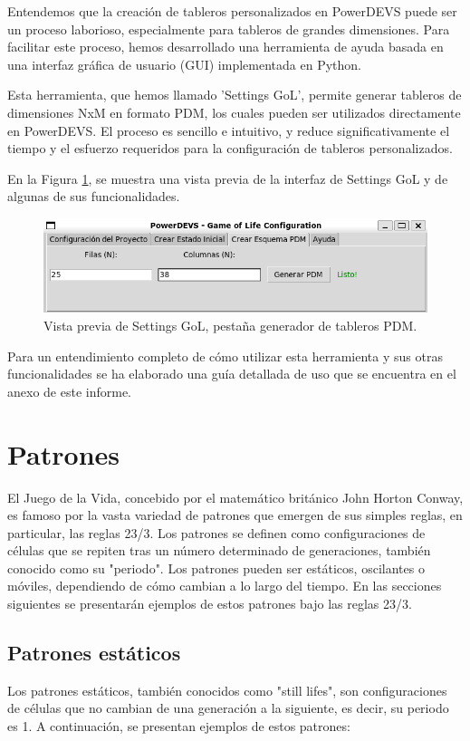\documentclass[]{article}
\begin{document}
Entendemos que la creación de tableros personalizados en PowerDEVS puede ser un proceso laborioso, especialmente para tableros de grandes dimensiones. Para facilitar este proceso, hemos desarrollado una herramienta de ayuda basada en una interfaz gráfica de usuario (GUI) implementada en Python.

Esta herramienta, que hemos llamado 'Settings GoL', permite generar tableros de dimensiones NxM en formato PDM, los cuales pueden ser utilizados directamente en PowerDEVS. El proceso es sencillo e intuitivo, y reduce significativamente el tiempo y el esfuerzo requeridos para la configuración de tableros personalizados.

En la Figura \ref{fig:settingsdevs}, se muestra una vista previa de la interfaz de Settings GoL y de algunas de sus funcionalidades.

\begin{figure}[H]
  \centering
  \includegraphics[width=1\textwidth]{../assets/pdevs/SettingsDevs.png}
  \caption{Vista previa de Settings GoL, pestaña generador de tableros PDM.}
  \label{fig:settingsdevs}
\end{figure}

Para un entendimiento completo de cómo utilizar esta herramienta y sus otras funcionalidades se ha elaborado una guía detallada de uso que se encuentra en el anexo de este informe.


\section{Patrones}
El Juego de la Vida, concebido por el matemático británico John Horton Conway, es famoso por la vasta variedad de patrones que emergen de sus simples reglas, en particular, las reglas 23/3. Los patrones se definen como configuraciones de células que se repiten tras un número determinado de generaciones, también conocido como su "periodo". Los patrones pueden ser estáticos, oscilantes o móviles, dependiendo de cómo cambian a lo largo del tiempo. En las secciones siguientes se presentarán ejemplos de estos patrones bajo las reglas 23/3.

\subsection{Patrones estáticos}
Los patrones estáticos, también conocidos como "still lifes", son configuraciones de células que no cambian de una generación a la siguiente, es decir, su periodo es 1. A continuación, se presentan ejemplos de estos patrones:
\end{document}
